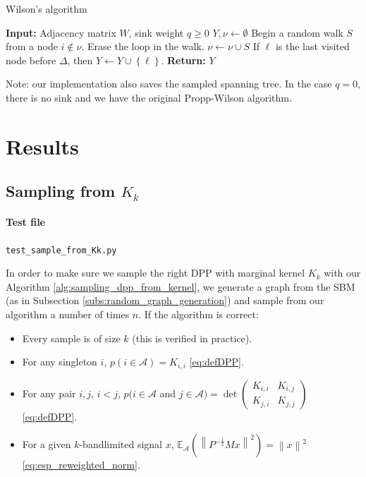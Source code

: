 \documentclass{article}
\newcommand{\norm}[1]{\left\|#1\right\|}
\begin{document}
\begin{algorithm}[ht]
\caption{Wilson's algorithm}
\label{alg:wilson_algorithm}
\begin{algorithmic} %
    \STATE \textbf{Input:} Adjacency matrix $W$, sink weight $q \geq 0$
    \STATE $Y, \nu \leftarrow \emptyset$
			\STATE Begin a random walk $S$ from a node $i \notin \nu$.
				\STATE Erase the loop in the walk.
				\STATE $\nu \leftarrow \nu \cup S$
					\STATE If $\ell$ is the last visited node before $\Delta$, then $Y \leftarrow Y \cup \left\{\ell\right\}$.
				\ENDIF
			\ENDIF
		\ENDWHILE
		\STATE \textbf{Return:} $Y$
\end{algorithmic}
Note: our implementation also saves the sampled spanning tree. In the case $q = 0$, there is no sink and we have the original Propp-Wilson algorithm.
\end{algorithm}


\section{Results}


\subsection[Sampling from Kk]{Sampling from $K_k$}


\paragraph{Test file} \verb#test_sample_from_Kk.py#


In order to make sure we sample the right DPP with marginal kernel $K_k$ with our Algorithm \ref{alg:sampling_dpp_from_kernel}, we generate a graph from the SBM (as in Subsection \ref{subs:random_graph_generation}) and sample from our algorithm a number of times $n$. If the algorithm is correct:
\begin{itemize}
\item Every sample is of size $k$ (this is verified in practice).
\item For any singleton $i$, $p(i \in \mathcal{A}) = K_{i, i}$ \eqref{eq:defDPP}.
\item For any pair $i, j$, $i < j$, $p(i \in \mathcal{A} $ and $ j \in \mathcal{A}) = \det \begin{pmatrix} K_{i, i} & K_{i, j} \\ K_{j, i} & K_{j, j} \end{pmatrix}$ \eqref{eq:defDPP}.
\item For a given $k$-bandlimited signal $x$, $\mathbb{E}_\mathcal{A} \left( \norm{P^{-\frac{1}{2}} M x}^2 \right) = \norm{x}^2$ \eqref{eq:esp_reweighted_norm}.
\end{itemize}
\end{document}
